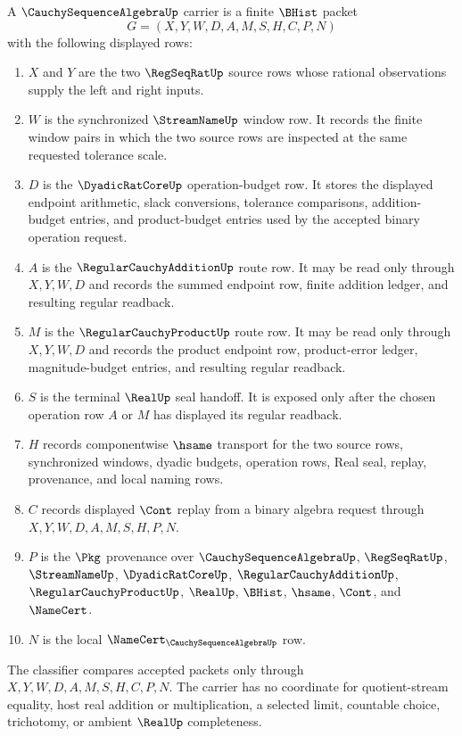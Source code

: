 \begin{definition}
\label{def:cauchy-sequence-algebra-carrier}
A $\CauchySequenceAlgebraUp$ carrier is a finite $\BHist$ packet
$$
G=(X,Y,W,D,A,M,S,H,C,P,N)
$$
with the following displayed rows:
\begin{enumerate}
\item $X$ and $Y$ are the two $\RegSeqRatUp$ source rows whose rational observations supply the left and right inputs.
\item $W$ is the synchronized $\StreamNameUp$ window row. It records the finite window pairs in which the two source rows are inspected at the same requested tolerance scale.
\item $D$ is the $\DyadicRatCoreUp$ operation-budget row. It stores the displayed endpoint arithmetic, slack conversions, tolerance comparisons, addition-budget entries, and product-budget entries used by the accepted binary operation request.
\item $A$ is the $\RegularCauchyAdditionUp$ route row. It may be read only through $X,Y,W,D$ and records the summed endpoint row, finite addition ledger, and resulting regular readback.
\item $M$ is the $\RegularCauchyProductUp$ route row. It may be read only through $X,Y,W,D$ and records the product endpoint row, product-error ledger, magnitude-budget entries, and resulting regular readback.
\item $S$ is the terminal $\RealUp$ seal handoff. It is exposed only after the chosen operation row $A$ or $M$ has displayed its regular readback.
\item $H$ records componentwise $\hsame$ transport for the two source rows, synchronized windows, dyadic budgets, operation rows, Real seal, replay, provenance, and local naming rows.
\item $C$ records displayed $\Cont$ replay from a binary algebra request through $X,Y,W,D,A,M,S,H,P,N$.
\item $P$ is the $\Pkg$ provenance over $\CauchySequenceAlgebraUp$, $\RegSeqRatUp$, $\StreamNameUp$, $\DyadicRatCoreUp$, $\RegularCauchyAdditionUp$, $\RegularCauchyProductUp$, $\RealUp$, $\BHist$, $\hsame$, $\Cont$, and $\NameCert$.
\item $N$ is the local $\NameCert_{\CauchySequenceAlgebraUp}$ row.
\end{enumerate}
The classifier compares accepted packets only through $X,Y,W,D,A,M,S,H,C,P,N$. The carrier has no coordinate for quotient-stream equality, host real addition or multiplication, a selected limit, countable choice, trichotomy, or ambient $\RealUp$ completeness.
\end{definition}

